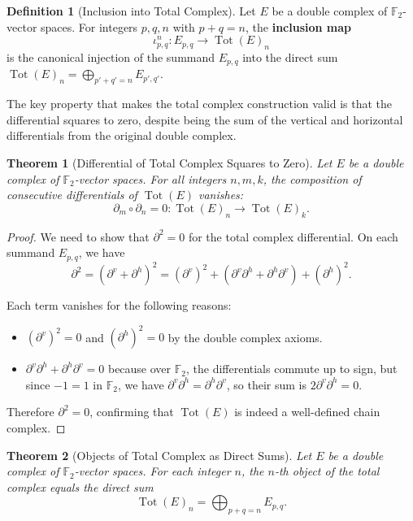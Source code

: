 \documentclass[11pt]{article}
\theoremstyle{plain}
\newtheorem*{theorem}{Theorem}
\theoremstyle{definition}
\newtheorem*{definition}{Definition}
\theoremstyle{remark}
\begin{document}
\begin{definition}[Inclusion into Total Complex]
Let $E$ be a double complex of $\mathbb{F}_2$-vector spaces. For integers $p, q, n$ with $p + q = n$, the \textbf{inclusion map}
\[
  \iota_{p,q}^n \colon E_{p,q} \longrightarrow \operatorname{Tot}(E)_n
\]
is the canonical injection of the summand $E_{p,q}$ into the direct sum $\operatorname{Tot}(E)_n = \bigoplus_{p'+q'=n} E_{p',q'}$.
\end{definition}

The key property that makes the total complex construction valid is that the differential squares to zero, despite being the sum of the vertical and horizontal differentials from the original double complex.

\begin{theorem}[Differential of Total Complex Squares to Zero]
Let $E$ be a double complex of $\mathbb{F}_2$-vector spaces. For all integers $n, m, k$, the composition of consecutive differentials of $\operatorname{Tot}(E)$ vanishes:
\[
  \partial_m \circ \partial_n = 0 \colon \operatorname{Tot}(E)_n \longrightarrow \operatorname{Tot}(E)_k.
\]
\end{theorem}

\begin{proof}
We need to show that $\partial^2 = 0$ for the total complex differential. On each summand $E_{p,q}$, we have
\[
\partial^2 = (\partial^v + \partial^h)^2 = (\partial^v)^2 + (\partial^v \partial^h + \partial^h \partial^v) + (\partial^h)^2.
\]

Each term vanishes for the following reasons:
\begin{itemize}
\item $(\partial^v)^2 = 0$ and $(\partial^h)^2 = 0$ by the double complex axioms.
\item $\partial^v \partial^h + \partial^h \partial^v = 0$ because over $\mathbb{F}_2$, the differentials commute up to sign, but since $-1 = 1$ in $\mathbb{F}_2$, we have $\partial^v \partial^h = \partial^h \partial^v$, so their sum is $2 \partial^v \partial^h = 0$.
\end{itemize}

Therefore $\partial^2 = 0$, confirming that $\operatorname{Tot}(E)$ is indeed a well-defined chain complex.
\end{proof}

\begin{theorem}[Objects of Total Complex as Direct Sums]
Let $E$ be a double complex of $\mathbb{F}_2$-vector spaces. For each integer $n$, the $n$-th object of the total complex equals the direct sum
\[
  \operatorname{Tot}(E)_n = \bigoplus_{p+q=n} E_{p,q}.
\]
\end{theorem}
\end{document}
